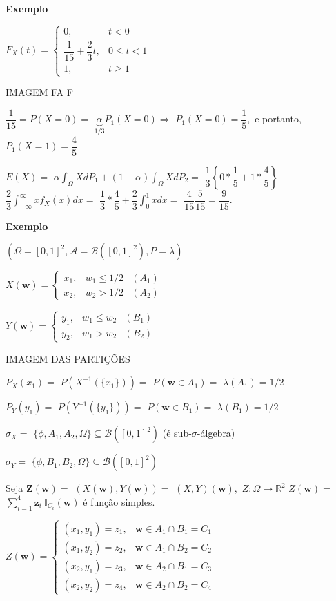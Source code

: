 \documentclass[
]{book}
\begin{document}
\textbf{Exemplo}

\(F_X(t)=\left\{\begin{array}{ll} 0, & t<0\\ \dfrac{1}{15}+\dfrac{2}{3}t, & 0\leq t < 1\\ 1, & t \geq 1\end{array}\right.\)

IMAGEM FA F

\(\dfrac{1}{15}=P(X=0)=\) \(\underbrace{\alpha}_{1/3} P_1(X=0) \Rightarrow\) \(P_1(X=0)=\dfrac{1}{5},\) e portanto, \(P_1(X=1)=\dfrac{4}{5}\)

\(E(X) =\) \(\alpha\int_\Omega XdP_1+(1-\alpha)\int_\Omega X dP_2=\) \(\dfrac{1}{3}\left\{0*\dfrac{1}{5}+1*\dfrac{4}{5}\right\}+\) \(\dfrac{2}{3}\int_{-\infty}^\infty x f_X(x)dx=\) \(\dfrac{1}{3}*\dfrac{4}{5}+\dfrac{2}{3}\int_0^1 xdx=\) \(\dfrac{4}{15}\dfrac{5}{15}=\dfrac{9}{15}.\)

\textbf{Exemplo}

\((\Omega=[0,1]^2, \mathcal{A}=\mathcal{B}([0,1]^2),P=\lambda)\)

\(X(\boldsymbol w)=\left\{\begin{array}{lll} x_1, & w_1 \leq 1/2 & (A_1)\\ x_2, & w_2 > 1/2 & (A_2)\end{array}\right.\)

\(Y(\boldsymbol w)=\left\{\begin{array}{lll} y_1, & w_1 \leq w_2 & (B_1)\\ y_2, & w_1 > w_2& (B_2)\end{array}\right.\)

IMAGEM DAS PARTIÇÕES

\(P_X(x_1)=\) \(P(X^{-1}(\{x_1\}))=\) \(P(\boldsymbol w \in A_1)=\) \(\lambda(A_1)=1/2\)

\(P_Y(y_1)=\) \(P(Y^{-1}(\{y_1\}))=\) \(P(\boldsymbol w \in B_1)=\) \(\lambda(B_1)=1/2\)

\(\sigma_X =\) \(\{\phi,A_1,A_2,\Omega\} \subseteq \mathcal{B}([0,1]^2)\) (é sub-\(\sigma\)-álgebra)

\(\sigma_Y =\) \(\{\phi,B_1,B_2,\Omega\} \subseteq \mathcal{B}([0,1]^2)\)

Seja \(\boldsymbol Z(\boldsymbol w)=\) \((X(\boldsymbol w), Y(\boldsymbol w))=\) \((X,Y)(\boldsymbol w),\) \(Z: \Omega\longrightarrow \mathbb{R}^2\) \(Z(\boldsymbol w)=\) \(\sum_{i=1}^4 \boldsymbol z_i ~\mathbb{I}_{C_i}(\boldsymbol w)\) é função simples.

\(Z(\boldsymbol w)=\left\{\begin{array}{ll} (x_1,y_1)=z_1, & \boldsymbol w \in A_1 \cap B_1=C_1\\ (x_1,y_2)=z_2, & \boldsymbol w \in A_1 \cap B_2=C_2\\ (x_2,y_1)=z_3, & \boldsymbol w \in A_2 \cap B_1=C_3\\ (x_2,y_2)=z_4, & \boldsymbol w \in A_2 \cap B_2=C_4 \end{array}\right.\)
\end{document}
